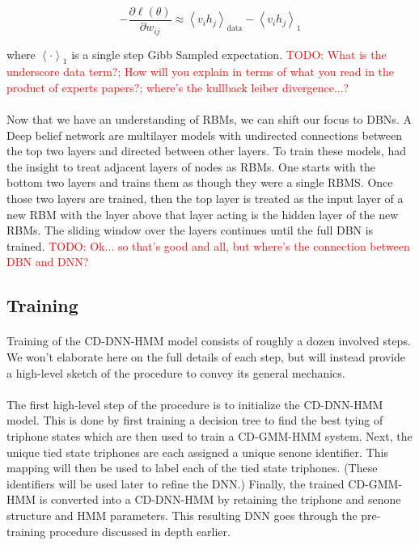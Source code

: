 \documentclass[letterpaper]{article}
\newcommand{\TODO}[1]{\textcolor{red}{TODO: #1}}
\newcommand{\partialDx}[2]{\frac{\partial #1}{ \partial #2  }}
\newcommand{\inAngle}[1]{\left \langle #1 \right \rangle}
\begin{document}
\begin{equation}
	- \partialDx{\ell(\theta)}{w_{ij}} \approx \inAngle{ v_i h_j }_\text{data} - \inAngle{ v_i h_j }_\text{1}
\end{equation}

where $\inAngle{ \cdot }_\text{1}$ is a single step Gibb Sampled expectation. \TODO{What is the underscore data term?; How will you explain in terms of what you read in the product of experts papers?; where's the kullback leiber divergence...? }

\paragraph{} Now that we have an understanding of RBMs, we can shift our focus to DBNs. A Deep belief network are multilayer models with undirected connections between the top two layers and directed between other layers. To train these models, \cite{DBLP:journals/neco/HintonOT06} had the insight to treat adjacent layers of nodes as RBMs. One starts with the bottom two layers and trains them as though they were a single RBMS. Once those two layers are trained, then the top layer is treated as the input layer of a new RBM with the layer above that layer acting is the hidden layer of the new RBMs. The sliding window over the layers continues until the full DBN is trained. \TODO{Ok... so that's good and all, but where's the connection between DBN and DNN?}

\subsection*{Training}

\paragraph{} Training of the CD-DNN-HMM model consists of roughly a dozen involved steps. We won't elaborate here on the full details of each step, but will instead provide a high-level sketch of the procedure to convey its general mechanics. 

\paragraph{} The first high-level step of the procedure is to initialize the CD-DNN-HMM model. This is done by first training a decision tree to find the best tying of triphone states which are then used to train a CD-GMM-HMM system. Next, the unique tied state triphones are each assigned a unique senone identifier. This mapping will then be used to label each of the tied state triphones. (These identifiers will be used later to refine the DNN.) Finally, the trained CD-GMM-HMM is converted into a CD-DNN-HMM by retaining the triphone and senone structure and HMM parameters. This resulting DNN goes through the pre-training procedure discussed in depth earlier. 
\end{document}
